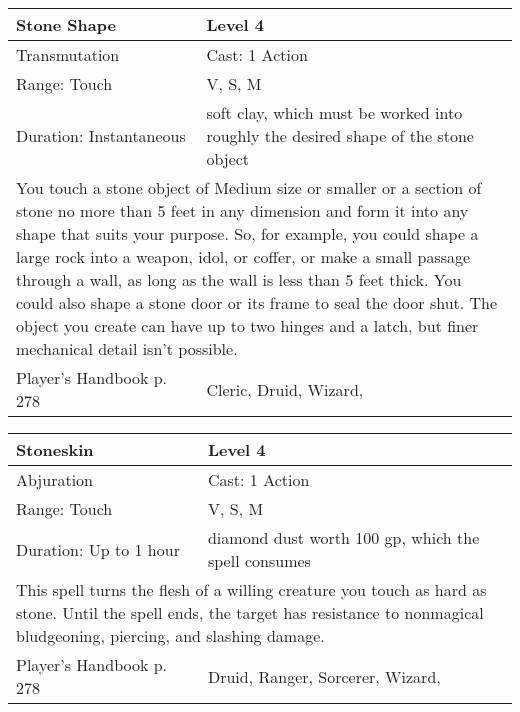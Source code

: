 \documentclass[11pt]{report}
\begin{document}
\begin{table}[H]
	\begin{tabular}{||p{6cm}|p{6cm}||}
		\hline\hline
		\bf{Stone Shape} & Level 4\\ \hline
		Transmutation & Cast: 1 Action\\ \hline
		Range: Touch & V, S, M\\ \hline
		Duration: Instantaneous & soft clay, which must be worked into roughly the desired shape of the stone object\\ \hline
		\multicolumn{2}{||p{12cm}||}{You touch a stone object of Medium size or smaller or a section of stone no more than 5 feet in any dimension and form it into any shape that suits your purpose. So, for example, you could shape a large rock into a weapon, idol, or coffer, or make a small passage through a wall, as long as the wall is less than 5 feet thick. You could also shape a stone door or its frame to seal the door shut. The object you create can have up to two hinges and a latch, but finer mechanical detail isn’t possible.}\\ \hline
Player's Handbook p. 278 & Cleric, Druid, Wizard, \\ \hline\hline
	\end{tabular}
\end{table}

\begin{table}[H]
	\begin{tabular}{||p{6cm}|p{6cm}||}
		\hline\hline
		\bf{Stoneskin} & Level 4\\ \hline
		Abjuration & Cast: 1 Action\\ \hline
		Range: Touch & V, S, M\\ \hline
		Duration: Up to 1 hour & diamond dust worth 100 gp, which the spell consumes\\ \hline
		\multicolumn{2}{||p{12cm}||}{This spell turns the flesh of a willing creature you touch as hard as stone. Until the spell ends, the target has resistance to nonmagical bludgeoning, piercing, and slashing damage.}\\ \hline
Player's Handbook p. 278 & Druid, Ranger, Sorcerer, Wizard, \\ \hline\hline
	\end{tabular}
\end{table}
\end{document}

